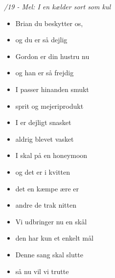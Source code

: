 \begin{center}
	\textit{/19 - Mel: I en kælder sort som kul}
	\parbox[t]{.5\textwidth}{%
	\begin{itemize}
		\setlength{\itemsep}{-5pt}
		\item[1.] Brian du beskytter os,
		\item[] og du er så dejlig
		\item[] Gordon er din hustru nu
		\item[] og han er så frejdig
		\item[] I passer hinanden smukt
		\item[] sprit og mejeriprodukt
		\item[] I er dejligt snasket
		\item[] aldrig blevet vasket
	\end{itemize}
}%
	\parbox[t]{.5\textwidth}{%
		\begin{itemize}
			\setlength{\itemsep}{-5pt}
			\item[2.] I skal på en honeymoon
			\item[] og det er i kvitten
			\item[] det en kæmpe ære er
			\item[] andre de trak nitten
			\item[] Vi udbringer nu en skål
			\item[] den har kun et enkelt mål
			\item[] Denne sang skal slutte
			\item[] så nu vil vi trutte
		\end{itemize}
	}%
\end{center}
